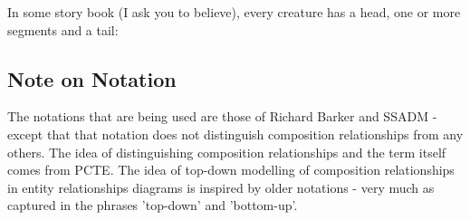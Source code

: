 \documentclass[10pt,a4paper]{article}
\begin{document}
\vspace{0.5cm}
\begin{JCexample}
\noindent In some story book (I ask you to believe), every creature has a head, one or more segments and a tail:
\begin{center}
\end{center}
\end{JCexample}


\subsection{Note on Notation}
The notations that are being used are those of Richard Barker and SSADM - except that that notation does not distinguish composition relationships from any others.
The idea of distinguishing composition relationships and the term itself comes from PCTE. The idea of top-down modelling of composition relationships in
entity relationships diagrams is inspired by older notations - very much as captured in the phrases 'top-down' and 'bottom-up'.
\end{document}
